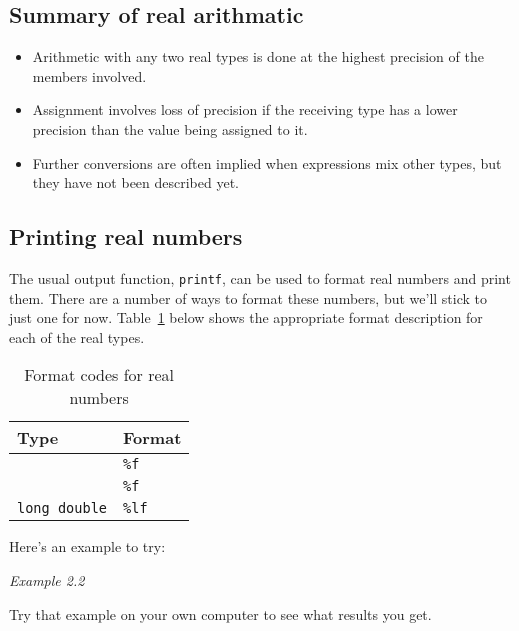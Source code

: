   \subsection{Summary of real arithmatic}

   \begin{itemize}
   \item
     Arithmetic with any two real types is done
     at the highest precision of the members involved.
   \item
     Assignment involves loss of precision if the receiving type has a lower
     precision than the value being assigned to it.
   \item
     Further conversions are often implied when expressions mix other types,
     but they have not been described yet.
   \end{itemize}

  

  \subsection{Printing real numbers}
   

   The usual output function, \texttt{printf}, can be used to format
    real numbers and print them. There are a number of ways to format these
    numbers, but we'll stick to just one for now.
    Table~\ref{tab:formatReal} below
    shows the appropriate format description for each of the real types.


    \begin{table}[htb]
      \centering
      \begin{tabular}{ll}
        \toprule
        Type                 & Format        \\
        \midrule
        \float{}             & \texttt{\%f}  \\
        \double{}            & \texttt{\%f}  \\
        \texttt{long double} & \texttt{\%lf} \\
        \bottomrule
      \end{tabular}
      \caption{\label{tab:formatReal}Format codes for real numbers}
    \end{table}


   Here's an example to try:


   \begin{center}\textit{Example 2.2}\end{center}


   Try that example on your own computer to see what results you get.


